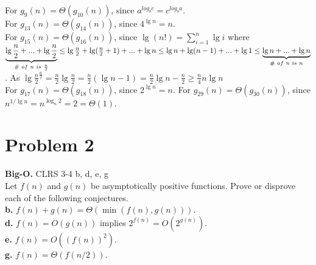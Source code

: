 \documentclass{article}
\theoremstyle{plain}
\begin{document}
For $g_9(n) = \Theta(g_{10}(n))$, since $a^{log_b c} = c^{log_b a}$.\\
For $g_{13}(n) = \Theta(g_{14}(n))$, since $4^{\lg n} = n$.\\
For $g_{15}(n) = \Theta(g_{16}(n))$, since $\lg(n!) =  {\textstyle \sum_{i=1}^{n}\lg i}$ where $\underbrace{\lg \frac{n}{2} + ...+ \lg \frac{n}{2}}_{\# \hspace{0.3em} of \hspace{0.3em} n \hspace{0.3em} is \hspace{0.3em} \frac{n}{2}} \leq \lg \frac{n}{2} + \lg(\frac{n}{2} + 1) +...+ \lg n \leq \lg n + \lg(n - 1) +...+ \lg 1 \leq \underbrace{\lg n + ...+ \lg n}_{\# \hspace{0.3em} of \hspace{0.3em} n \hspace{0.3em} is \hspace{0.3em} n}$. As $\lg {\frac{n}{2}}^{\frac{n}{2}} = \frac{n}{2} \lg \frac{n}{2} = \frac{n}{2} (\lg n - 1) = \frac{n}{2} \lg n - \frac{n}{2} \geq \frac{n}{4} n \lg n$\\
For $g_{17}(n) = \Theta(g_{18}(n))$, since $2^{\lg n} = n$.
For $g_{29}(n) = \Theta(g_{30}(n))$, since $n^{1/{\lg n}} = n^{\log_n 2} = 2 = \Theta(1)$.

\section*{Problem 2}
\textbf{Big-O.}
CLRS 3-4 b, d, e, g\\
Let $f(n)$ and $g(n)$ be asymptotically positive functions. Prove or disprove each of the following conjectures.\\
\textbf{b.} $f(n) + g(n) = \Theta(\min(f(n), g(n)))$.\\
\textbf{d.} $f(n) = O(g(n))$ implies $2^{f(n)} = O(2^{g(n)})$.\\
\textbf{e.} $f(n) = O((f(n))^2)$.\\
\textbf{g.} $f(n) = \Theta(f(n/2))$.\\
\end{document}
